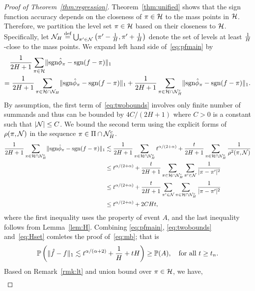\documentclass[11pt]{article}
\theoremstyle{plain}
\theoremstyle{definition}
\def\sign{\textup{sgn}}
\begin{document}
\begin{proof}[Proof of Theorem~\ref{thm:regression}]
Theorem~\ref{thm:unified} shows that the sign function accuracy depends on the closeness of $\pi\in \mathcal{H}$ to the mass points in $\mathcal{H}$. Therefore, we partition the level set $\pi \in \mathcal{H}$ based on their closeness to $\mathcal{H}$. Specifically, let $\mathcal{N}_H \stackrel{\text{def}}{=}\bigcup_{\pi'\in\mathcal{N}}\left(\pi'-\frac{1}{H},\pi'+\frac{1}{H}\right)$ denote the set of levels at least $1\over H$-close to the mass points. We expand left hand side of~\eqref{eq:pfmain} by
\begin{align}\label{eq:twobounds}
&{1\over 2H+1}\sum_{\pi \in \tH}\onenormSize{}{\sign \hat \phi_\pi - \sign (f-\pi)} \notag \\
=& \ {1\over 2H+1}\sum_{\pi \in \tH \cap \tN_H} \onenormSize{}{\sign \hat \phi_\pi - \sign (f-\pi)} +{1\over 2H+1}\sum_{\pi \in \tH \cap \tN_H^c} \onenormSize{}{\sign \hat \phi_\pi - \sign (f-\pi)} .
\end{align}
By assumption, the first term of~\eqref{eq:twobounds} involves only finite number of summands and thus can be bounded by $4C/(2H + 1)$ where $C > 0$ is a constant such that $|\mathcal{N}|\leq C$. We bound the second term using the explicit forms of $\rho(\pi, \mathcal{N})$ in the sequence $\pi \in\Pi\cap \mathcal{N}_H^c$. 
\begin{align}\label{eq:Hset}
{1\over 2H+1}\sum_{\pi \in \tH\cap \tN_H^c} \onenormSize{}{\sign \hat \phi_\pi- \sign (f-\pi)} &\lesssim  {1\over 2H+1}\sum_{\pi\in \tH\cap \tN_H^c} t^{\alpha/(2+\alpha)}+{t\over 2H+1}\sum_{\pi \in \tH\cap \tN_H^c}{1\over \rho^2(\pi, \tN)}\\
&\leq t^{\alpha/(2+\alpha)}+{t\over 2H+1} \sum_{\pi \in \tH\cap \tN_H^c} \sum_{\pi' \in \tN}{1\over |\pi-\pi'|^2}\\
&\leq  t^{\alpha/(2+\alpha)}+{t\over 2H+1} \sum_{\pi'\in \tN} \sum_{\pi \in \tH\cap \tN_H^c}{1\over |\pi-\pi'|^2}\\
&\leq t^{\alpha/(2+\alpha)}+ 2CHt,
\end{align}
where the first inequality uses the property of event $A$, and the last inequality follows from Lemma~\ref{lem:H}. Combining \eqref{eq:pfmain}, \eqref{eq:twobounds} and~\eqref{eq:Hset} comletes the proof of~\eqref{eq:mb}; that is
\begin{equation}\label{eq:A}
\mathbb{P}\left(\lVert\hat f-f\rVert_1\lesssim t^{\alpha/(\alpha+2)}+{1\over H}+tH\right)\geq\mathbb{P}(A), \quad \text{for all }t\geq t_n.
\end{equation}
Based on Remark~\ref{rmk:lt} and union bound over $\pi\in\mathcal{H}$, we have,
\begin{align}\label{eq:prob}

\end{align}
\end{proof}
\end{document}
